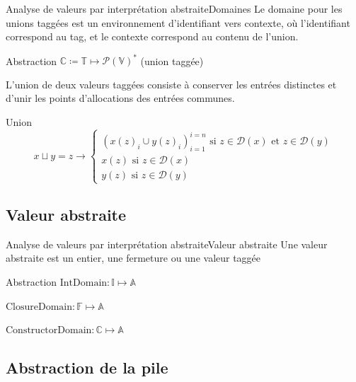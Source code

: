 \documentclass{beamer}
\begin{document}
\begin{frame}{Analyse de valeurs par interprétation abstraite}{Domaines}
    Le domaine pour les unions taggées est un environnement d'identifiant vers contexte, où l'identifiant correspond au tag, et le contexte correspond au contenu de l'union.

    \begin{block}{Abstraction}
        $\mathbb{C} \coloneqq \mathbb{T} \mapsto \mathcal{P}(\mathbb{V})^{*}$ (union taggée)
    \end{block}

    L'union de deux valeurs taggées consiste à conserver les entrées distinctes et d'unir les points d'allocations des entrées communes.%
    
    \begin{block}{Union}
        $$
        x \sqcup y = z \rightarrow
        \begin{cases}
            \left( x(z)_i \cup y(z)_i \right)_{i=1}^{i=n} \text{ si } z \in \mathcal{D}(x) \text{ et } z \in \mathcal{D}(y) \\
            x(z) \text{ si } z \in \mathcal{D}(x) \\
            y(z) \text{ si } z \in \mathcal{D}(y)
        \end{cases}
        $$
    \end{block}
\end{frame}

\subsection{Valeur abstraite}

\begin{frame}{Analyse de valeurs par interprétation abstraite}{Valeur abstraite}
    Une valeur abstraite est un entier, une fermeture ou une valeur taggée

    \begin{block}{Abstraction}
        $\text{IntDomain} : \mathbb{I} \mapsto \mathbb{A}$

        $\text{ClosureDomain} : \mathbb{F} \mapsto \mathbb{A}$

        $\text{ConstructorDomain} : \mathbb{C} \mapsto \mathbb{A}$
    \end{block}
\end{frame}

\subsection{Abstraction de la pile}
\end{document}
